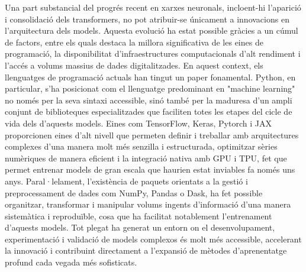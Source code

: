 \documentclass[a4paper,11pt, titlepage, twoside]{article}
\begin{document}
Una part substancial del progrés recent en xarxes neuronals, incloent-hi l'aparició i consolidació dels transformers, no pot atribuir-se únicament a innovacions en l'arquitectura dels models. Aquesta evolució ha estat possible gràcies a un cúmul de factors, entre els quals destaca la millora significativa de les eines de programació, la disponibilitat d'infraestructures computacionals d'alt rendiment i l'accés a volums massius de dades digitalitzades. En aquest context, els llenguatges de programació actuals han tingut un paper fonamental. Python, en particular, s'ha posicionat com el llenguatge predominant en "machine learning" no només per la seva sintaxi accessible, sinó també per la maduresa d'un ampli conjunt de biblioteques especialitzades que faciliten totes les etapes del cicle de vida dels d'aquests models. Eines com TensorFlow, Keras, Pytorch i JAX proporcionen eines d'alt nivell que permeten definir i treballar amb arquitectures complexes d'una manera molt més senzilla i estructurada, optimitzar sèries numèriques de manera eficient i la integració nativa amb GPU i TPU, fet que permet entrenar models de gran escala que haurien estat inviables fa només uns anys. Paral·lelament, l'existència de paquets orientats a la gestió i preprocessament de dades com NumPy, Pandas o Dask, ha fet possible organitzar, transformar i manipular volums ingents d'informació d'una manera sistemàtica i reproduïble, cosa que ha facilitat notablement l'entrenament d'aquests models. Tot plegat ha generat un entorn on el desenvolupament, experimentació i validació de models complexos és molt més accessible, accelerant la innovació i contribuint directament a l'expansió de mètodes d'aprenentatge profund cada vegada més sofisticats.
\end{document}
